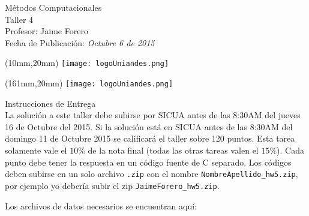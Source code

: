 \documentclass[11pt,letterpaper]{exam}
\begin{document}
\begin{center}
{\Large Métodos Computacionales} \\
Taller 4 \\
Profesor: Jaime Forero\\
Fecha de Publicación: {\small \it Octubre 6 de 2015}\\
\end{center}

\begin{textblock*}{40mm}(10mm,20mm)
  \texttt{[image: logoUniandes.png]}
\end{textblock*}

\begin{textblock*}{40mm}(161mm,20mm)
  \texttt{[image: logoUniandes.png]}
\end{textblock*}

\vspace{0.5cm}

{\Large Instrucciones de Entrega}\\

\noindent
La solución a este taller debe subirse por SICUA antes de las 8:30AM
del jueves 16 de Octubre del 2015. 
\noindent
Si la soluci\'on est\'a en SICUA
antes de las 8:30AM del domingo 11 de Octubre 2015 se calificar\'a
el taller sobre 120 puntos. 
\noindent
Esta tarea solamente vale el $10\%$ de la nota final (todas las otras
tareas valen el $15\%$).
\noindent
Cada punto debe tener la respuesta en un c\'odigo fuente de C
separado. Los c\'odigos deben subirse en un solo archivo
\verb".zip" con el nombre \verb"NombreApellido_hw5.zip", por ejemplo
yo deber\'ia subir el zip \verb"JaimeForero_hw5.zip".

\noindent
Los archivos de datos necesarios se encuentran aqu\'i:
\end{document}
